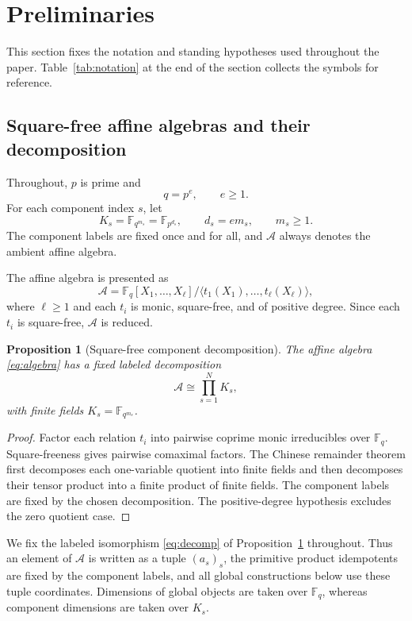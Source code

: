 \documentclass[11pt]{article}
\newcommand{\F}{\mathbb F}
\newcommand{\A}{\mathcal A}
\theoremstyle{plain}
\newtheorem{proposition}{Proposition}
\theoremstyle{definition}
\theoremstyle{remark}
\begin{document}
\section{Preliminaries}\label{sec:prelim}

This section fixes the notation and standing hypotheses used throughout the paper. Table~\ref{tab:notation} at the end of the section collects the symbols for reference.

\subsection{Square-free affine algebras and their decomposition}

Throughout, $p$ is prime and
\[
q=p^e,\qquad e\geq 1.
\]
For each component index $s$, let
\[
K_s=\F_{q^{m_s}}=\F_{p^{d_s}},\qquad d_s=e m_s,\qquad m_s\geq 1.
\]
The component labels are fixed once and for all, and $\A$ always denotes the ambient affine algebra.

The affine algebra is presented as
\begin{equation}\label{eq:algebra}
\A=\F_q[X_1,\ldots,X_\ell]
 \big/\langle t_1(X_1),\ldots,t_\ell(X_\ell)\rangle,
\end{equation}
where $\ell\geq 1$ and each $t_i$ is monic, square-free, and of positive degree. Since each $t_i$ is square-free, $\A$ is reduced.

\begin{proposition}[Square-free component decomposition]\label{prop:decomposition}
The affine algebra \eqref{eq:algebra} has a fixed labeled decomposition
\begin{equation}\label{eq:decomp}
\A\cong\prod_{s=1}^{N}K_s,
\end{equation}
with finite fields $K_s=\F_{q^{m_s}}$.
\end{proposition}

\begin{proof}
Factor each relation $t_i$ into pairwise coprime monic irreducibles over $\F_q$. Square-freeness gives pairwise comaximal factors. The Chinese remainder theorem first decomposes each one-variable quotient into finite fields and then decomposes their tensor product into a finite product of finite fields. The component labels are fixed by the chosen decomposition. The positive-degree hypothesis excludes the zero quotient case.
\end{proof}

We fix the labeled isomorphism \eqref{eq:decomp} of Proposition~\ref{prop:decomposition} throughout. Thus an element of $\A$ is written as a tuple $(a_s)_s$, the primitive product idempotents are fixed by the component labels, and all global constructions below use these tuple coordinates. Dimensions of global objects are taken over $\F_q$, whereas component dimensions are taken over $K_s$.
\end{document}
